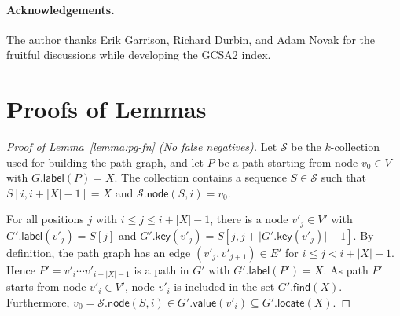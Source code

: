 \documentclass[a4paper,11pt]{llncs}
\newcommand{\abs}[1]{\ensuremath{\lvert #1 \rvert}}
\newcommand{\find}{\ensuremath{\mathsf{find}}}
\newcommand{\locate}{\ensuremath{\mathsf{locate}}}
\newcommand{\glabel}{\ensuremath{\mathsf{label}}}
\newcommand{\gkey}{\ensuremath{\mathsf{key}}}
\newcommand{\gvalue}{\ensuremath{\mathsf{value}}}
\newcommand{\gnode}{\ensuremath{\mathsf{node}}}
\newcommand{\kcollection}[1]{$#1$\nobreakdash-collection}
\begin{document}
\paragraph*{Acknowledgements.}

The author thanks Erik Garrison, Richard Durbin, and Adam Novak for the fruitful discussions while developing the GCSA2 index.






\clearpage
\appendix
\section{Proofs of Lemmas}\label{appendix:proofs}

\begin{proof}[Proof of Lemma~\ref{lemma:pg-fn} (No false negatives)]
Let $\mathcal{S}$ be the \kcollection{k} used for building the path graph, and let $P$ be a path starting from node $v_{0} \in V$ with $G.\glabel(P) = X$. The collection contains a sequence $S \in \mathcal{S}$ such that $S[i, i+\abs{X}-1] = X$ and $\mathcal{S}.\gnode(S, i) = v_{0}$.

For all positions $j$ with $i \le j \le i+\abs{X}-1$, there is a node $v'_{j} \in V'$ with $G'.\glabel(v'_{j}) = S[j]$ and $G'.\gkey(v'_{j}) = S[j, j+\abs{G'.\gkey(v'_{j})}-1]$.
By definition, the path graph has an edge $(v'_{j}, v'_{j+1}) \in E'$ for $i \le j < i+\abs{X}-1$.
Hence $P' = v'_{i} \dotsm v'_{i+\abs{X}-1}$ is a path in $G'$ with $G'.\glabel(P') = X$.
As path $P'$ starts from node $v'_{i} \in V'$, node $v'_{i}$ is included in the set $G'.\find(X)$.
Furthermore, $v_{0} = \mathcal{S}.\gnode(S, i) \in G'.\gvalue(v'_{i}) \subseteq G'.\locate(X)$.
\end{proof}
\end{document}
